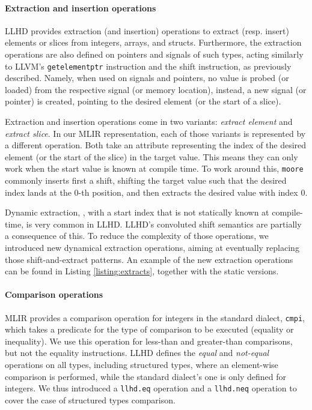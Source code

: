 \paragraph{Extraction and insertion operations}
LLHD provides extraction (and insertion) operations to extract (resp. insert) elements or slices from integers, arrays, and structs. Furthermore, the extraction operations are also defined on pointers and signals of such types, acting similarly to LLVM's \texttt{getelementptr} instruction and the shift instruction, as previously described. Namely, when used on signals and pointers, no value is probed (or loaded) from the respective signal (or memory location), instead, a new signal (or pointer) is created, pointing to the desired element (or the start of a slice).

Extraction and insertion operations come in two variants: \textit{extract element} and \textit{extract slice}. In our MLIR representation, each of those variants is represented by a different operation. Both take an attribute representing the index of the desired element (or the start of the slice) in the target value. This means they can only work when the start value is known at compile time. To work around this, \texttt{moore} commonly inserts first a shift, shifting the target value such that the desired index lands at the $0$-th position, and then extracts the desired value with index $0$.

Dynamic extraction, \ie, with a start index that is not statically known at compile-time, is very common in LLHD. LLHD's convoluted shift semantics are partially a consequence of this. To reduce the complexity of those operations, we introduced new dynamical extraction operations, aiming at eventually replacing those shift-and-extract patterns. An example of the new extraction operations can be found in Listing \ref{listing:extracts}, together with the static versions.


\paragraph{Comparison operations}
MLIR provides a comparison operation for integers in the standard dialect, \texttt{cmpi}, which takes a predicate for the type of comparison to be executed (\eg equality or inequality). We use this operation for less-than and greater-than comparisons, but not the equality instructions. LLHD defines the \textit{equal} and \textit{not-equal} operations on all types, including structured types, where an element-wise comparison is performed, while the standard dialect's one is only defined for integers. We thus introduced a \texttt{llhd.eq} operation and a \texttt{llhd.neq} operation to cover the case of structured types comparison.
